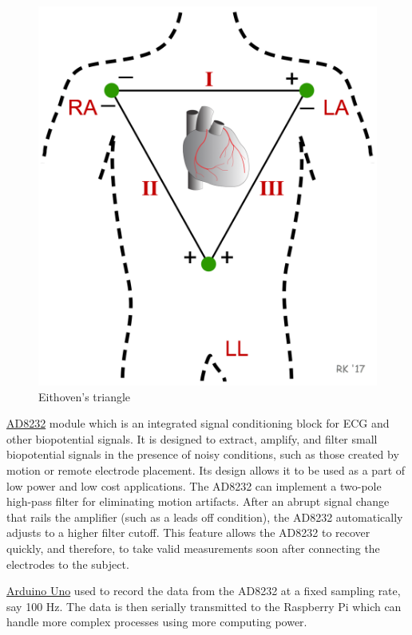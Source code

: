\documentclass[11pt]{article}
\theoremstyle{definition}
\begin{document}
  \begin{figure}
    \centering
    \includegraphics[scale=0.1]{images/eithoven_triangle.png}
    \caption{Eithoven's triangle\cite{cvp:ECG_eithoven}}
    \label{fig:eithoven_triangle}
  \end{figure}

  \underline{AD8232}\cite{ae:ad8232} module which is an integrated signal conditioning block for ECG and other biopotential signals.
  It is designed to extract, amplify, and filter small biopotential signals in the presence of noisy conditions, such as those created by motion or remote electrode placement.
  Its design allows it to be used as a part of low power and low cost applications.
  The AD8232 can implement a two-pole high-pass filter for eliminating motion artifacts.
  After an abrupt signal change that rails the amplifier (such as a leads off condition), the AD8232 automatically adjusts to a higher filter cutoff.
  This feature allows the AD8232 to recover quickly, and therefore, to take valid measurements soon after connecting the electrodes to the subject.


  \underline{Arduino Uno} used to record the data from the AD8232 at a fixed sampling rate, say 100 Hz.
  The data is then serially transmitted to the Raspberry Pi which can handle more complex processes using more computing power.
  
\end{document}
